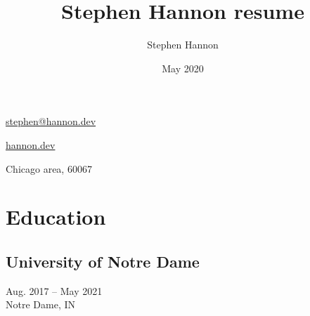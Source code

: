 \documentclass[letterpaper,10pt]{article}
\title{Stephen Hannon resume}
\author{Stephen Hannon}
\date{May 2020}
\begin{document}
\begin{minipage}[t]{\dimexpr.33\textwidth-.5\columnsep}
\begin{flushleft}

{\ttfamily\large\raggedleft

    \href{mailto:stephen@hannon.dev}{stephen@hannon.dev}

    \href{https://hannon.dev}{hannon.dev}
    
    Chicago area, 60067
    
}

\section{Education}
\subsection{University of Notre Dame}

{\raggedleft
Aug. 2017 -- May 2021 \\
Notre Dame, IN

}


\end{flushleft}
\end{minipage}
\end{document}
